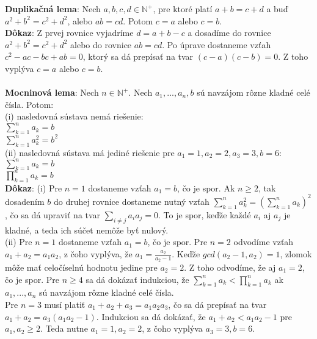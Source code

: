 \documentclass[12pt]{article}
\begin{document}
\textbf{Duplikačná lema}: Nech $a,b,c,d \in \mathbb{N^+}$, pre ktoré platí $a + b = c + d$ a buď $a^2 + b^2 = c^2 + d^2$, alebo $ab = cd$. Potom $c = a$ alebo $c = b$. \\
 
\textbf{Dôkaz}: Z prvej rovnice vyjadríme $d = a + b - c$ a dosadíme do rovnice $a^2 + b^2 = c^2 + d^2$ alebo do rovnice $ab = cd$. Po úprave dostaneme vzťah $c^2 - ac - bc + ab = 0$, ktorý sa dá prepísať na tvar $(c - a)(c - b) = 0$. Z toho vyplýva $c = a$ alebo $c = b$. \\\\

\textbf{Mocninová lema}: Nech $n \in \mathbb{N^+}$. Nech $a_1, ... , a_n , b$ sú navzájom rôzne kladné celé čísla. Potom: \\
(i) nasledovná sústava nemá riešenie: \\
$\sum_{k=1}^{n} a_k = b$ \\
$\sum_{k=1}^{n} a^2_k = b^2$ \\
(ii) nasledovná sústava má jediné riešenie pre $a_1 = 1, a_2 = 2, a_3 = 3, b = 6$: \\
$\sum_{k=1}^{n} a_k = b$ \\
$\prod_{k=1}^{n} a_k = b$ \\

\textbf{Dôkaz}: (i) Pre $n = 1$ dostaneme vzťah $a_1 = b$, čo je spor. Ak $n \geq 2$, tak dosadením $b$ do druhej rovnice dostaneme nutný vzťah $\sum_{k=1}^{n} a^2_k = (\sum_{k=1}^{n} a_k)^2$, čo sa dá upraviť na tvar $\sum_{i \neq j} a_i a_j = 0$. To je spor, keďže každé $a_i$ aj $a_j$ je kladné, a teda ich súčet nemôže byť nulový. \\

(ii) Pre $n = 1$ dostaneme vzťah $a_1 = b$, čo je spor. Pre $n = 2$ odvodíme vzťah $a_1 + a_2 = a_1 a_2$, z čoho vyplýva, že $a_1 = \frac{a_2}{a_2 - 1}$. Keďže $gcd(a_2 - 1, a_2) = 1$, zlomok môže mať celočíselnú hodnotu jedine pre $a_2 = 2$. Z toho odvodíme, že aj $a_1 = 2$, čo je spor. Pre $n \geq 4$ sa dá dokázať indukciou, že $\sum_{k=1}^{n} a_k < \prod_{k=1}^{n} a_k$ ak $a_1, ... , a_n$ sú navzájom rôzne kladné celé čísla. \\

Pre $n = 3$ musí platiť $a_1 + a_2 + a_3 = a_1 a_2 a_3$, čo sa dá prepísať na tvar $a_1 + a_2 = a_3 (a_1 a_2 - 1)$. Indukciou sa dá dokázať, že $a_1 + a_2 < a_1 a_2 - 1$ pre $a_1, a_2 \geq 2$. Teda nutne $a_1 = 1, a_2 = 2$, z čoho vyplýva $a_3 = 3, b = 6$. \\\\
\end{document}
